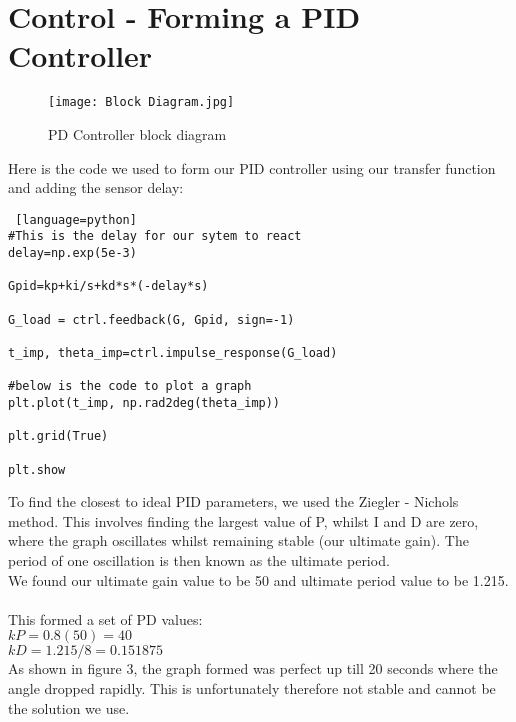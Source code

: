 \documentclass{article}
\numberwithin{equation}{section}
\begin{document}
\newpage
\section{Control - Forming a PID Controller}
\begin{figure}
    \centering
    \texttt{[image: Block Diagram.jpg]}
    \caption{PD Controller block diagram}
    \label{fig:enter-label}
\end{figure}
Here is the code we used to form our PID controller using our transfer function and adding the sensor delay:
\begin{lstlisting} [language=python]
#This is the delay for our sytem to react
delay=np.exp(5e-3)

Gpid=kp+ki/s+kd*s*(-delay*s)

G_load = ctrl.feedback(G, Gpid, sign=-1)

t_imp, theta_imp=ctrl.impulse_response(G_load)

#below is the code to plot a graph
plt.plot(t_imp, np.rad2deg(theta_imp))

plt.grid(True)

plt.show

\end{lstlisting}
To find the closest to ideal PID parameters, we used the Ziegler - Nichols method.
This involves finding the largest value of P, whilst I and D are zero, where the graph oscillates whilst remaining stable (our ultimate gain). The period of one oscillation is then known as the ultimate period.\\
We found our ultimate gain value to be 50 and ultimate period value to be 1.215.\\\\
%
%
This formed a set of PD values:\\
\(kP = 0.8(50) = 40\)\\
\(kD = 1.215/8 = 0.151875\)\\
As shown in figure 3, the graph formed was perfect up till 20 seconds where the angle dropped rapidly. This is unfortunately therefore not stable and cannot be the solution we use.
\end{document}
